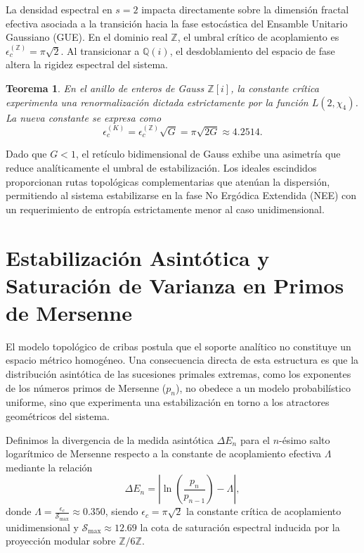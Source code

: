 \documentclass{article}
\numberwithin{equation}{section}
\theoremstyle{plain}
\newtheorem{teorema}{Teorema}[section]
\theoremstyle{definition}
\begin{document}
La densidad espectral en $s=2$ impacta directamente sobre la dimensión fractal efectiva asociada a la transición hacia la fase estocástica del Ensamble Unitario Gaussiano (GUE). En el dominio real $\mathbb{Z}$, el umbral crítico de acoplamiento es $\epsilon_c^{(\mathbb{Z})} = \pi\sqrt{2}$. Al transicionar a $\mathbb{Q}(i)$, el desdoblamiento del espacio de fase altera la rigidez espectral del sistema.

\begin{teorema}
\label{teo:acoplamiento_catalan}
En el anillo de enteros de Gauss $\mathbb{Z}[i]$, la constante crítica experimenta una renormalización dictada estrictamente por la función $L(2, \chi_4)$. La nueva constante se expresa como
\begin{equation}
    \epsilon_c^{(K)} = \epsilon_c^{(\mathbb{Z})} \sqrt{G} = \pi \sqrt{2G} \approx 4.2514.
\end{equation}
\end{teorema}

Dado que $G < 1$, el retículo bidimensional de Gauss exhibe una asimetría que reduce analíticamente el umbral de estabilización. Los ideales escindidos proporcionan rutas topológicas complementarias que atenúan la dispersión, permitiendo al sistema estabilizarse en la fase No Ergódica Extendida (NEE) con un requerimiento de entropía estrictamente menor al caso unidimensional.

\section{Estabilización Asintótica y Saturación de Varianza en Primos de Mersenne}
\label{sec:cristalizacion_asintotica}

El modelo topológico de cribas postula que el soporte analítico no constituye un espacio métrico homogéneo. Una consecuencia directa de esta estructura es que la distribución asintótica de las sucesiones primales extremas, como los exponentes de los números primos de Mersenne ($p_n$), no obedece a un modelo probabilístico uniforme, sino que experimenta una estabilización en torno a los atractores geométricos del sistema.

Definimos la divergencia de la medida asintótica $\Delta E_n$ para el $n$-ésimo salto logarítmico de Mersenne respecto a la constante de acoplamiento efectiva $\Lambda$ mediante la relación
\begin{equation}
    \Delta E_n = \left\lvert \ln\left(\frac{p_n}{p_{n-1}}\right) - \Lambda \right\rvert,
\end{equation}
donde $\Lambda = \frac{\epsilon_c}{\mathcal{S}_{\max}} \approx 0.350$, siendo $\epsilon_c = \pi\sqrt{2}$ la constante crítica de acoplamiento unidimensional y $\mathcal{S}_{\max} \approx 12.69$ la cota de saturación espectral inducida por la proyección modular sobre $\mathbb{Z}/6\mathbb{Z}$.
\end{document}
